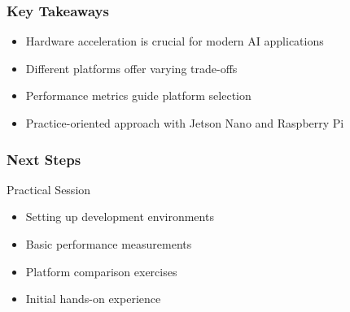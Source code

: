 \documentclass{beamer}
\begin{document}
\begin{frame}
    \frametitle{Key Takeaways}
    \begin{itemize}
        \item Hardware acceleration is crucial for modern AI applications
        \item Different platforms offer varying trade-offs
        \item Performance metrics guide platform selection
        \item Practice-oriented approach with Jetson Nano and Raspberry Pi
    \end{itemize}
\end{frame}

\begin{frame}
    \frametitle{Next Steps}
    \begin{block}{Practical Session}
        \begin{itemize}
            \item Setting up development environments
            \item Basic performance measurements
            \item Platform comparison exercises
            \item Initial hands-on experience
        \end{itemize}
    \end{block}
\end{frame}
\end{document}
